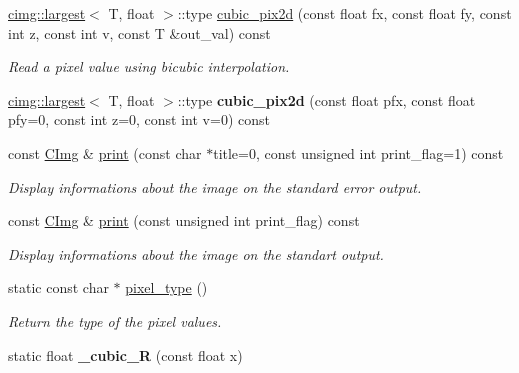 \begin{DoxyCompactItemize}
\item 
\hyperlink{structcimg__library_1_1cimg_1_1largest}{cimg::largest}$<$ T, float $>$::type \hyperlink{structcimg__library_1_1_c_img_af919e664ee4773be9964003cbf4c38ce}{cubic\_\-pix2d} (const float fx, const float fy, const int z, const int v, const T \&out\_\-val) const 
\begin{DoxyCompactList}\small\item\em Read a pixel value using bicubic interpolation. \item\end{DoxyCompactList}\item 
\hypertarget{structcimg__library_1_1_c_img_af7e345695f673b551cb784fdba979957}{
\hyperlink{structcimg__library_1_1cimg_1_1largest}{cimg::largest}$<$ T, float $>$::type {\bfseries cubic\_\-pix2d} (const float pfx, const float pfy=0, const int z=0, const int v=0) const }
\label{structcimg__library_1_1_c_img_af7e345695f673b551cb784fdba979957}

\item 
const \hyperlink{structcimg__library_1_1_c_img}{CImg} \& \hyperlink{structcimg__library_1_1_c_img_a29c40d60c9eac664831cc2b69839ed6d}{print} (const char $\ast$title=0, const unsigned int print\_\-flag=1) const 
\begin{DoxyCompactList}\small\item\em Display informations about the image on the standard error output. \item\end{DoxyCompactList}\item 
\hypertarget{structcimg__library_1_1_c_img_a5ac80140c655fc7da457a2a537fde409}{
const \hyperlink{structcimg__library_1_1_c_img}{CImg} \& \hyperlink{structcimg__library_1_1_c_img_a5ac80140c655fc7da457a2a537fde409}{print} (const unsigned int print\_\-flag) const }
\label{structcimg__library_1_1_c_img_a5ac80140c655fc7da457a2a537fde409}

\begin{DoxyCompactList}\small\item\em Display informations about the image on the standart output. \item\end{DoxyCompactList}\item 
static const char $\ast$ \hyperlink{structcimg__library_1_1_c_img_a40381e3f35687e554852725b13eb4fa9}{pixel\_\-type} ()
\begin{DoxyCompactList}\small\item\em Return the type of the pixel values. \item\end{DoxyCompactList}\item 
\hypertarget{structcimg__library_1_1_c_img_a0ab3755c8560520a2fd2691ab15c4d9e}{
static float {\bfseries \_\-cubic\_\-R} (const float x)}
\label{structcimg__library_1_1_c_img_a0ab3755c8560520a2fd2691ab15c4d9e}

\end{DoxyCompactItemize}
